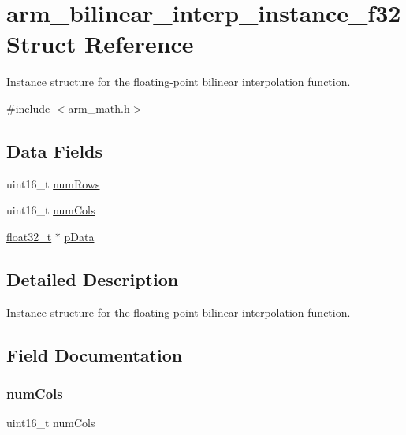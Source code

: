 \hypertarget{structarm__bilinear__interp__instance__f32}{}\section{arm\+\_\+bilinear\+\_\+interp\+\_\+instance\+\_\+f32 Struct Reference}
\label{structarm__bilinear__interp__instance__f32}


Instance structure for the floating-\/point bilinear interpolation function.  




{\ttfamily \#include $<$arm\+\_\+math.\+h$>$}

\subsection*{Data Fields}
\begin{DoxyCompactItemize}
\item 
uint16\+\_\+t \mbox{\hyperlink{structarm__bilinear__interp__instance__f32_a1bcf80ccdc2acc29198f1592ae300390}{num\+Rows}}
\item 
uint16\+\_\+t \mbox{\hyperlink{structarm__bilinear__interp__instance__f32_a4bb5ec0d13eb4c9cf887aa8366a44117}{num\+Cols}}
\item 
\mbox{\hyperlink{arm__math_8h_a4611b605e45ab401f02cab15c5e38715}{float32\+\_\+t}} $\ast$ \mbox{\hyperlink{structarm__bilinear__interp__instance__f32_af5c3a2f15c98850cdcfbe6f87e5ac5df}{p\+Data}}
\end{DoxyCompactItemize}


\subsection{Detailed Description}
Instance structure for the floating-\/point bilinear interpolation function. 

\subsection{Field Documentation}
\mbox{\label{structarm__bilinear__interp__instance__f32_a4bb5ec0d13eb4c9cf887aa8366a44117}} 
\subsubsection{\texorpdfstring{numCols}{numCols}}
{\footnotesize\ttfamily uint16\+\_\+t num\+Cols}

